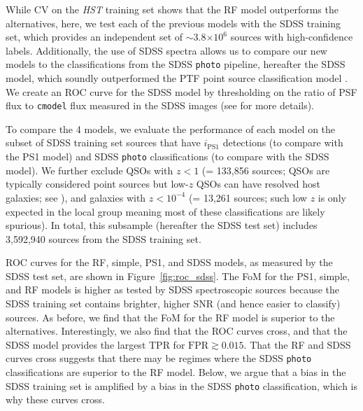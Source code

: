\documentclass[twocolumn]{aastex62}
\begin{document}
\begin{CJK*}{UTF8}{gbsn}
While CV on the \textit{HST} training set shows that the RF model
outperforms the alternatives, here, we test each of the previous models with
the SDSS training set, which provides an independent set of $\sim$3.8$\times
10^6$ sources with high-confidence labels. Additionally, the use of SDSS
spectra allows us to compare our new models to the classifications from the
SDSS \texttt{photo} pipeline, hereafter the SDSS model, which soundly
outperformed the PTF point source classification model \citep{Miller17}. We
create an ROC curve for the SDSS model by thresholding on the ratio of PSF
flux to \texttt{cmodel} flux measured in the SDSS images (see
\citealt{Miller17} for more details).

To compare the 4 models, we evaluate the performance of each model on the
subset of SDSS training set sources that have $i_\mathrm{PS1}$ detections
(to compare with the PS1 model) and SDSS \texttt{photo} classifications (to
compare with the SDSS model). We further exclude QSOs with $z < 1$ (=
133,856 sources; QSOs are typically considered point sources but low-$z$
QSOs can have resolved host galaxies; see \citealt{Miller17}), and galaxies
with $z < 10^{-4}$ (= 13,261 sources; such low $z$ is only expected in the
local group meaning most of these classifications are likely spurious). In
total, this subsample (hereafter the SDSS test set) includes 3,592,940
sources from the SDSS training set.

ROC curves for the RF, simple, PS1, and SDSS models, as measured by the SDSS
test set, are shown in Figure~\ref{fig:roc_sdss}. The FoM for the PS1,
simple, and RF models is higher as tested by SDSS spectroscopic sources
because the SDSS training set contains brighter, higher SNR (and hence
easier to classify) sources. As before, we find that the FoM for the RF
model is superior to the alternatives. Interestingly, we also find that the
ROC curves cross, and that the SDSS model provides the largest TPR for
$\mathrm{FPR} \gtrsim 0.015$. That the RF and SDSS curves cross suggests
that there may be regimes where the SDSS \texttt{photo} classifications are
superior to the RF model. Below, we argue that a bias in the SDSS training
set is amplified by a bias in the SDSS \texttt{photo} classification, which
is why these curves cross.



\end{CJK*}
\end{document}
